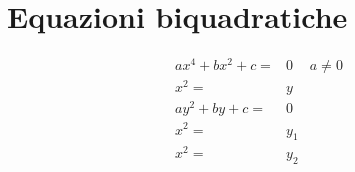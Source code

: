 \chapter{Equazioni biquadratiche}
\begin{align}
ax^4+bx^2+c=&0&a\neq 0\\
x^2=&y\\
ay^2+by+c=&0\\
x^2=&y_1\\
x^2=&y_2
\end{align}
